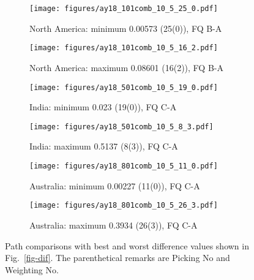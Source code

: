 \begin{figure*}
	\centering
	\begin{subfigure}{.42\textwidth} %
		\texttt{[image: figures/ay18\_101comb\_10\_5\_25\_0.pdf]}
		\caption{North America: minimum 0.00573 (25(0)), FQ
		B-A}\label{fig-nac-105250}
	\end{subfigure}
	\begin{subfigure}{.42\textwidth} %
		\texttt{[image: figures/ay18\_101comb\_10\_5\_16\_2.pdf]}
		\caption{North America: maximum 0.08601 (16(2)), FQ
		B-A}\label{fig-nac-105162}
	\end{subfigure}
	\vspace{.1em}
	\begin{subfigure}{.42\textwidth}
		\texttt{[image: figures/ay18\_501comb\_10\_5\_19\_0.pdf]}
		\caption{India: minimum 0.023 (19(0)), FQ C-A}\label{fig-ind-105190}
	\end{subfigure}
	\begin{subfigure}{.42\textwidth}
		\texttt{[image: figures/ay18\_501comb\_10\_5\_8\_3.pdf]}
		\caption{India: maximum 0.5137 (8(3)), FQ C-A}\label{fig-ind-10583}
	\end{subfigure}
	\vspace{.1em}
	\begin{subfigure}{.42\textwidth}
		\texttt{[image: figures/ay18\_801comb\_10\_5\_11\_0.pdf]}
		\caption{Australia: minimum 0.00227 (11(0)), FQ C-A}\label{fig-au-105110}
	\end{subfigure}
	\begin{subfigure}{.42\textwidth}
		\texttt{[image: figures/ay18\_801comb\_10\_5\_26\_3.pdf]}
		\caption{Australia: maximum 0.3934 (26(3)), FQ C-A}\label{fig-au-105263}
	\end{subfigure}
	\caption[Best and worst differences (10 Myr bin, 5 Myr step)]{Path
comparisons with best and worst difference values shown in Fig.~\ref{fig-dif}.
The parenthetical remarks are Picking No and Weighting No.}\label{fig-difbw}
\end{figure*}

